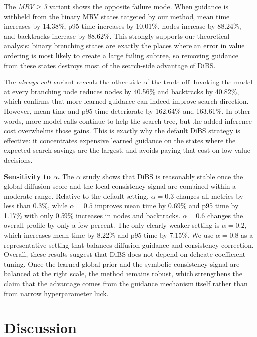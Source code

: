 \documentclass[lettersize,journal]{IEEEtran}
\begin{document}
The \textit{MRV\(\geq\)3} variant shows the opposite failure mode.
When guidance is withheld from the binary MRV states targeted by our method, mean time increases by 14.38\%, p95 time increases by 10.01\%, nodes increase by 88.24\%, and backtracks increase by 88.62\%.
This strongly supports our theoretical analysis: binary branching states are exactly the places where an error in value ordering is most likely to create a large failing subtree, so removing guidance from these states destroys most of the search-side advantage of DiBS.

The \textit{always-call} variant reveals the other side of the trade-off.
Invoking the model at every branching node reduces nodes by 40.56\% and backtracks by 40.82\%, which confirms that more learned guidance can indeed improve search direction.
However, mean time and p95 time deteriorate by 162.64\% and 163.61\%.
In other words, more model calls continue to help the search tree, but the added inference cost overwhelms those gains.
This is exactly why the default DiBS strategy is effective: it concentrates expensive learned guidance on the states where the expected search savings are the largest, and avoids paying that cost on low-value decisions.

\textbf{Sensitivity to \(\alpha\).} The \(\alpha\) study shows that DiBS is reasonably stable once the global diffusion score and the local consistency signal are combined within a moderate range.
Relative to the default setting, \(\alpha=0.3\) changes all metrics by less than 0.3\%, while \(\alpha=0.5\) improves mean time by 0.69\% and p95 time by 1.17\% with only 0.59\% increases in nodes and backtracks.
\(\alpha=0.6\) changes the overall profile by only a few percent.
The only clearly weaker setting is \(\alpha=0.2\), which increases mean time by 8.22\% and p95 time by 7.15\%. We use $\alpha=0.8$ as a representative setting that balances diffusion guidance and consistency correction.
Overall, these results suggest that DiBS does not depend on delicate coefficient tuning.
Once the learned global prior and the symbolic consistency signal are balanced at the right scale, the method remains robust, which strengthens the claim that the advantage comes from the guidance mechanism itself rather than from narrow hyperparameter luck.






\section{Discussion}
\end{document}
